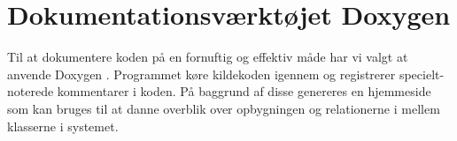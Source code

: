 \section{Dokumentationsværktøjet Doxygen}

Til at dokumentere koden på en fornuftig og effektiv måde har vi valgt at anvende Doxygen \citep{doxygenWeb}. Programmet køre kildekoden igennem og registrerer specielt-noterede kommentarer i koden. På baggrund af disse genereres en hjemmeside som kan bruges til at danne overblik over opbygningen og relationerne i mellem klasserne i systemet.